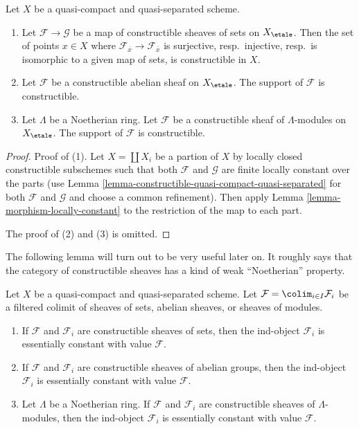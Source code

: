 \begin{lemma}
\label{lemma-support-constructible}
Let $X$ be a quasi-compact and quasi-separated scheme.
\begin{enumerate}
\item Let $\mathcal{F} \to \mathcal{G}$ be a map of constructible
sheaves of sets on $X_\etale$. Then the set of points $x \in X$
where $\mathcal{F}_{\overline{x}} \to \mathcal{F}_{\overline{x}}$
is surjective, resp.\ injective, resp.\ is isomorphic to a given map
of sets, is constructible in $X$.
\item Let $\mathcal{F}$ be a constructible abelian sheaf on $X_\etale$.
The support of $\mathcal{F}$ is constructible.
\item Let $\Lambda$ be a Noetherian ring.
Let $\mathcal{F}$ be a constructible sheaf of $\Lambda$-modules on $X_\etale$.
The support of $\mathcal{F}$ is constructible.
\end{enumerate}
\end{lemma}

\begin{proof}
Proof of (1).
Let $X = \coprod X_i$ be a partion of $X$ by locally closed constructible
subschemes such that both $\mathcal{F}$ and $\mathcal{G}$ are
finite locally constant over the parts (use
Lemma \ref{lemma-constructible-quasi-compact-quasi-separated}
for both $\mathcal{F}$ and $\mathcal{G}$ and choose a common
refinement). Then apply Lemma \ref{lemma-morphism-locally-constant}
to the restriction of the map to each part.

\medskip\noindent
The proof of (2) and (3) is omitted.
\end{proof}

\noindent
The following lemma will turn out to be very useful later on.
It roughly says that the category of constructible sheaves
has a kind of weak ``Noetherian'' property.

\begin{lemma}
\label{lemma-colimit-constructible}
Let $X$ be a quasi-compact and quasi-separated scheme. Let
$\mathcal{F} = \colim_{i \in I} \mathcal{F}_i$ be a filtered
colimit of sheaves of sets, abelian sheaves, or sheaves of modules.
\begin{enumerate}
\item If $\mathcal{F}$ and $\mathcal{F}_i$ are constructible sheaves of
sets, then the ind-object $\mathcal{F}_i$ is essentially constant with
value $\mathcal{F}$.
\item If $\mathcal{F}$ and $\mathcal{F}_i$ are constructible sheaves of
abelian groups, then the ind-object $\mathcal{F}_i$ is essentially constant
with value $\mathcal{F}$.
\item Let $\Lambda$ be a Noetherian ring.
If $\mathcal{F}$ and $\mathcal{F}_i$ are constructible sheaves of
$\Lambda$-modules, then the ind-object $\mathcal{F}_i$ is essentially constant
with value $\mathcal{F}$.
\end{enumerate}
\end{lemma}

